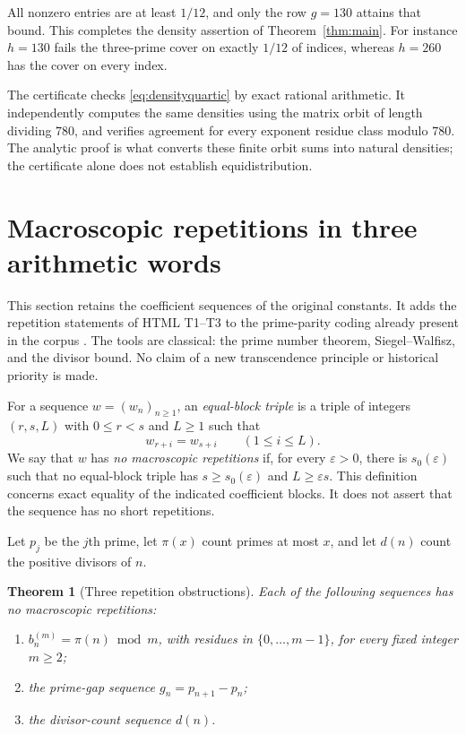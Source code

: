 \documentclass[11pt,a4paper]{article}
\newtheorem{theorem}{Theorem}[section]
\theoremstyle{definition}\newtheorem{definition}[theorem]{Definition}
\theoremstyle{remark}\newtheorem{remark}[theorem]{Remark}
\begin{document}
All nonzero entries are at least $1/12$, and only the row $g=130$ attains that bound. This completes the density assertion of Theorem~\ref{thm:main}. For instance $h=130$ fails the three-prime cover on exactly $1/12$ of indices, whereas $h=260$ has the cover on every index.

The certificate checks \eqref{eq:densityquartic} by exact rational arithmetic. It independently computes the same densities using the matrix orbit of length dividing $780$, and verifies agreement for every exponent residue class modulo $780$. The analytic proof is what converts these finite orbit sums into natural densities; the certificate alone does not establish equidistribution.



\section{Macroscopic repetitions in three arithmetic words}
\label{arith:sec:repetition}

This section retains the coefficient sequences of the original constants.
It adds the repetition statements of HTML T1--T3 to the prime-parity coding
already present in the corpus \cite{Corpus003}.  The tools are classical:
the prime number theorem, Siegel--Walfisz, and the divisor bound.  No claim
of a new transcendence principle or historical priority is made.

For a sequence $w=(w_n)_{n\ge1}$, an \emph{equal-block triple} is a triple
of integers $(r,s,L)$ with $0\le r<s$ and $L\ge1$ such that
\[
 w_{r+i}=w_{s+i}\qquad(1\le i\le L).
\]
We say that $w$ has \emph{no macroscopic repetitions} if, for every
$\varepsilon>0$, there is $s_0(\varepsilon)$ such that no equal-block
triple has $s\ge s_0(\varepsilon)$ and $L\ge\varepsilon s$.
This definition concerns exact equality of the indicated coefficient
blocks.  It does not assert that the sequence has no short repetitions.

Let $p_j$ be the $j$th prime, let $\pi(x)$ count primes at most $x$, and
let $d(n)$ count the positive divisors of $n$.

\begin{theorem}[Three repetition obstructions]\label{arith:thm:words}
Each of the following sequences has no macroscopic repetitions:
\begin{enumerate}
\item $b_n^{(m)}=\pi(n)\bmod m$, with residues in $\{0,\ldots,m-1\}$,
for every fixed integer $m\ge2$;
\item the prime-gap sequence $g_n=p_{n+1}-p_n$;
\item the divisor-count sequence $d(n)$.
\end{enumerate}
\end{theorem}
\end{document}
